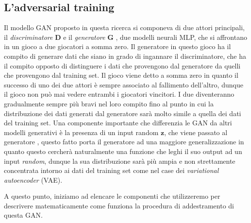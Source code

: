 \subsection{L'adversarial training}
Il modello GAN proposto in questa ricerca si componeva di due attori principali, il \textit{discriminatore} $\mathbf{D}$ e il \textit{generatore} $\mathbf{G}$
, due modelli neurali MLP, che si affrontano in un gioco a due giocatori a somma zero.
Il generatore in questo gioco ha il compito di generare dati che siano in grado di ingannare il discriminatore, che ha il compito opposto di distinguere i dati che 
provengono dal generatore da quelli che provengono dal training set. Il gioco viene detto a somma zero in quanto il successo di uno dei due attori è sempre
associato al fallimento dell'altro, dunque il gioco non può mai vedere entrambi i giocatori vincitori. 
I due diventeranno gradualmente sempre più bravi nel loro compito fino al punto
in cui la distribuzione dei dati generati dal generatore sarà molto simile a quella dei dati del training set.
Una componente importante che differenzia le GAN da altri modelli generativi è la presenza di un input random $\mathbf{z}$, che viene passato al generatore
, questo fatto porta il generatore ad una maggiore generalizzazione in quanto questo cercherà naturalmente una 
funzione che leghi il suo output ad un input \textit{random}, dunque la sua distribuzione sarà più ampia e non strettamente concentrata intorno ai dati del training set
come nel case dei \textit{variational autoencoder} (VAE).

A questo punto, iniziamo ad elencare le componenti che utilizzeremo per descrivere matematicamente come funziona la procedura di addestramento 
di questa GAN.

